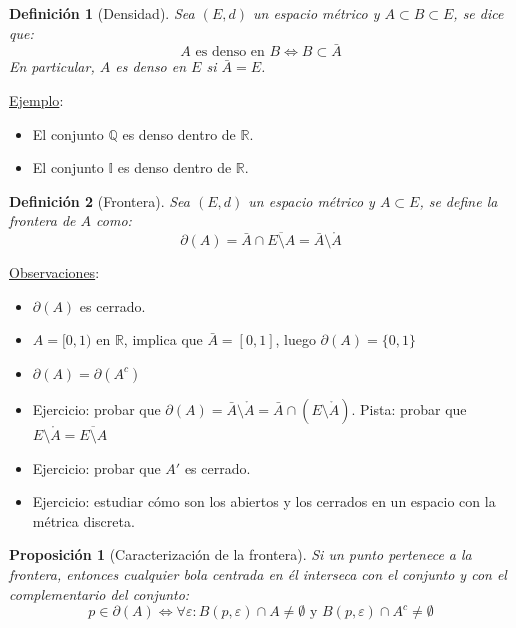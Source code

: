 \documentclass[10pt,a4paper,openright]{book}
\theoremstyle{break}
\newtheorem*{defi}{Definición}
\newtheorem*{prop}{Proposición}
\begin{document}
\begin{defi}[Densidad]
Sea $(E,d)$ un espacio métrico y $A\subset B \subset E$, se dice que:
$$A \mbox{ es denso en }B \Leftrightarrow B\subset \bar{A}$$
En particular, $A$ es denso en $E$ si $\bar{A} = E$.
\end{defi}

\underline{Ejemplo}:
\begin{itemize}
\item El conjunto $\mathbb{Q}$ es denso dentro de $\mathbb{R}$.
\item El conjunto $\mathbb{I}$ es denso dentro de $\mathbb{R}$.
\end{itemize}

\begin{defi}[Frontera]
Sea $(E,d)$ un espacio métrico y $A\subset E$, se define la frontera de $A$ como:
$$\partial(A) = \bar{A}\cap \overline{E\setminus{A}} = \bar{A}\setminus{\mathring{A}}$$
\end{defi}

\underline{Observaciones}:

\begin{itemize}
\item $\partial(A)$ es cerrado.
\item $A=[0,1)$ en $\mathbb{R}$, implica que $\bar{A} = [0,1]$, luego $\partial(A) = \{0,1\}$
\item $\partial(A) = \partial(A^c)$
\item Ejercicio: probar que $\partial(A)=\bar{A}\setminus{\mathring{A}} = \bar{A}\cap (E\setminus{\mathring{A}})$. Pista: probar que $E\setminus{{\mathring{A}}} = \overline{E\setminus{A}}$
\item Ejercicio: probar que $A'$ es cerrado.
\item Ejercicio: estudiar cómo son los abiertos y los cerrados en un espacio con la métrica discreta.
\end{itemize}

\begin{prop}[Caracterización de la frontera]
Si un punto pertenece a la frontera, entonces cualquier bola centrada en él interseca con el conjunto y con el complementario del conjunto:
$$p\in \partial(A) \Leftrightarrow \forall \varepsilon: B(p,\varepsilon)\cap A \neq \emptyset \mbox{ y } B(p,\varepsilon)\cap A^c \neq \emptyset$$
\end{prop}
\end{document}
